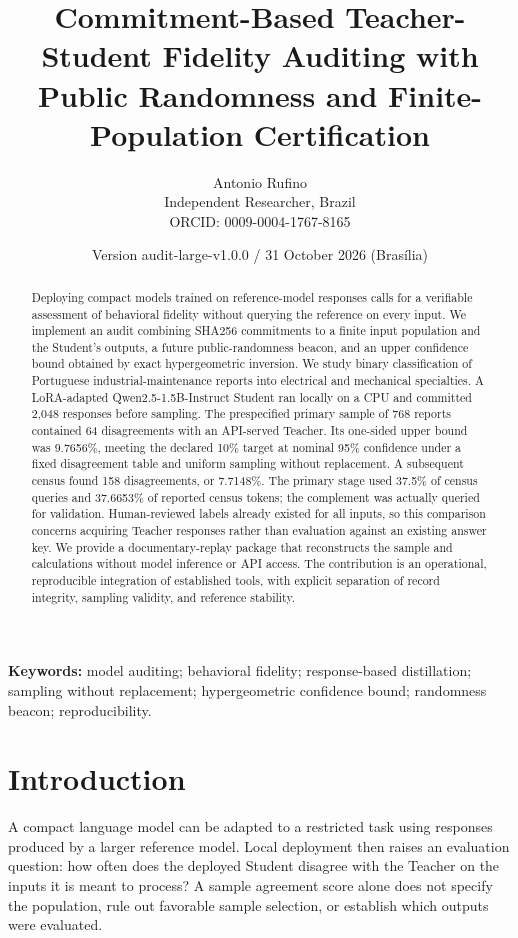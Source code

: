 \documentclass[
  10pt,
]{article}
\title{Commitment-Based Teacher-Student Fidelity Auditing with Public
Randomness and Finite-Population Certification}
\author{Antonio Rufino\\
Independent Researcher, Brazil\\
ORCID: 0009-0004-1767-8165}
\date{Version audit-large-v1.0.0 / 31 October 2026 (Brasília)}
\let\oldsection\section
\renewcommand{\section}{\needspace{5\baselineskip}\oldsection}
\begin{document}
\maketitle
\begin{abstract}
Deploying compact models trained on reference-model responses calls for
a verifiable assessment of behavioral fidelity without querying the
reference on every input. We implement an audit combining SHA256
commitments to a finite input population and the Student's outputs, a
future public-randomness beacon, and an upper confidence bound obtained
by exact hypergeometric inversion. We study binary classification of
Portuguese industrial-maintenance reports into electrical and mechanical
specialties. A LoRA-adapted Qwen2.5-1.5B-Instruct Student ran locally on
a CPU and committed 2,048 responses before sampling. The prespecified
primary sample of 768 reports contained 64 disagreements with an
API-served Teacher. Its one-sided upper bound was 9.7656\%, meeting the
declared 10\% target at nominal 95\% confidence under a fixed
disagreement table and uniform sampling without replacement. A
subsequent census found 158 disagreements, or 7.7148\%. The primary
stage used 37.5\% of census queries and 37.6653\% of reported census
tokens; the complement was actually queried for validation.
Human-reviewed labels already existed for all inputs, so this comparison
concerns acquiring Teacher responses rather than evaluation against an
existing answer key. We provide a documentary-replay package that
reconstructs the sample and calculations without model inference or API
access. The contribution is an operational, reproducible integration of
established tools, with explicit separation of record integrity,
sampling validity, and reference stability.
\end{abstract}

\textbf{Keywords:} model auditing; behavioral fidelity; response-based
distillation; sampling without replacement; hypergeometric confidence
bound; randomness beacon; reproducibility.

\hypertarget{introduction}{%
\section{Introduction}\label{introduction}}

A compact language model can be adapted to a restricted task using
responses produced by a larger reference model. Local deployment then
raises an evaluation question: how often does the deployed Student
disagree with the Teacher on the inputs it is meant to process? A sample
agreement score alone does not specify the population, rule out
favorable sample selection, or establish which outputs were evaluated.
\end{document}
